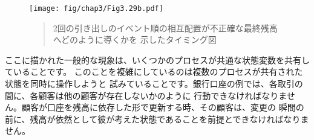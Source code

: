 \begin{figure}[tp]
\label{Figure 3.29}
\centering
\begin{comment}
\heading{Figure 3.29:} Timing diagram showing how interleaving the order of events 
in two banking withdrawals can lead to an incorrect final balance.

\begin{example}
 |           Peter              Bank              Paul
 |                              ____
 |                             /    \
 |             .--------------| \$100 |-------------.
 |             |               \____/              |
 |             V                                   V
 |  .----------------------.            .----------------------.           
 |  | Access balance: \$100 |            | Access balance: \$100 |
 |  `----------+-----------'            `----------+-----------'
 |             V                                   V
 |  .----------------------.            .----------------------.           
 |  | new value: 100-10=90 |            | new value: 100-25=75 |
 |  `----------+-----------'            `----------+-----------'
 |             V                                   |
 |  .----------------------.                       |
 |  | set! balance to \$90  |                       |
 |  `----------+-----------'    ____               |
 |             |               /    \              |
 |             `------------->| \$ 90 |             V
 |                             \____/   .----------------------.
 |                                      | new value: 100-25=75 |
 |                              ____    `----------+-----------'
 |                             /    \              |
 |                            | \$ 90 |<------------'
 V                             \____/
time
\end{example}
\end{comment}
\texttt{[image: fig/chap3/Fig3.29b.pdf]}
\begin{quote}
 2回の引き出しのイベント順の相互配置が不正確な最終残高へどのように導くかを
示したタイミング図
\end{quote}
\end{figure}

\noindent
ここに描かれた一般的な現象は、いくつかのプロセスが共通な状態変数を共有していることです。
このことを複雑にしているのは複数のプロセスが共有された状態を同時に操作しようと
試みていることです。銀行口座の例では、各取引の間に、各顧客は他の顧客が存在しないかのように
行動できなければなりません。顧客が口座を残高に依存した形で更新する時、その顧客は、変更の
瞬間の前に、残高が依然として彼が考えた状態であることを前提とできなければなりません。

